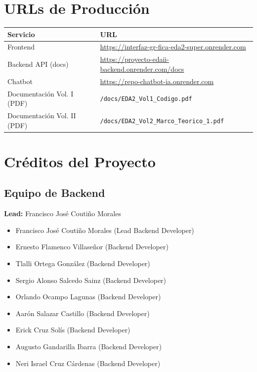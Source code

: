 \documentclass[12pt, letterpaper]{article}
\begin{document}
	\section{URLs de Producción}
	\begin{table}[h!]
		\centering
		\begin{tabular}{@{}ll@{}}
			\toprule
			\textbf{Servicio} & \textbf{URL} \\
			\midrule
			Frontend & \url{https://interfaz-gr-fica-eda2-super.onrender.com} \\
			Backend API (docs) & \url{https://proyecto-edaii-backend.onrender.com/docs} \\
			Chatbot & \url{https://repo-chatbot-ia.onrender.com} \\
			Documentación Vol. I (PDF) & \texttt{/docs/EDA2\_Vol1\_Codigo.pdf} \\
			Documentación Vol. II (PDF) & \texttt{/docs/EDA2\_Vol2\_Marco\_Teorico\_1.pdf} \\
			\bottomrule
		\end{tabular}
	\end{table}
	
	\newpage
	\section{Créditos del Proyecto}
	\subsection{Equipo de Backend}
	\textbf{Lead:} Francisco José Coutiño Morales
	\begin{itemize}[noitemsep]
		\item Francisco José Coutiño Morales (Lead Backend Developer)
		\item Ernesto Flamenco Villaseñor (Backend Developer)
		\item Tlalli Ortega González (Backend Developer)
		\item Sergio Alonso Salcedo Sainz (Backend Developer)
		\item Orlando Ocampo Lagunas (Backend Developer)
		\item Aarón Salazar Castillo (Backend Developer)
		\item Erick Cruz Solís (Backend Developer)
		\item Augusto Gandarilla Ibarra (Backend Developer)
		\item Neri Israel Cruz Cárdenas (Backend Developer)
	\end{itemize}
	
\end{document}
